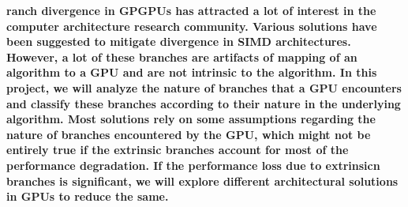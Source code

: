 
\textbf{ranch divergence in GPGPUs has attracted a lot of interest in the computer architecture research community. Various solutions have been suggested to mitigate divergence in SIMD architectures. However, a lot of these branches are artifacts of mapping of an algorithm to a GPU and are not intrinsic to the algorithm. In this project, we will analyze the nature of branches that a GPU encounters and classify these branches according to their nature in the underlying algorithm. Most solutions rely on some assumptions regarding the nature of branches encountered by the GPU, which might not be entirely true if the extrinsic branches account for most of the performance degradation. If the performance loss due to extrinsicn branches is significant, we will explore different architectural solutions in GPUs to reduce the same.}


